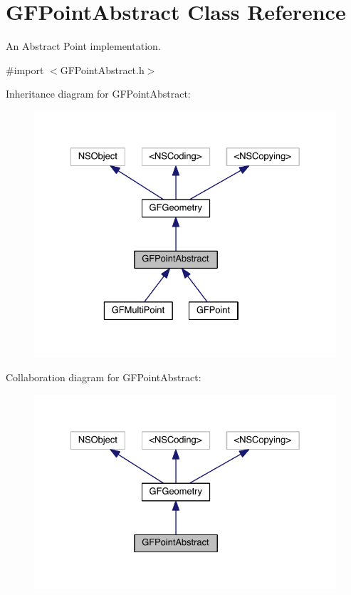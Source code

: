 \hypertarget{interface_g_f_point_abstract}{}\section{G\+F\+Point\+Abstract Class Reference}
\label{interface_g_f_point_abstract}


An Abstract Point implementation.  




{\ttfamily \#import $<$G\+F\+Point\+Abstract.\+h$>$}



Inheritance diagram for G\+F\+Point\+Abstract\+:\nopagebreak
\begin{figure}[H]
\begin{center}
\leavevmode
\includegraphics[width=329pt]{interface_g_f_point_abstract__inherit__graph}
\end{center}
\end{figure}


Collaboration diagram for G\+F\+Point\+Abstract\+:\nopagebreak
\begin{figure}[H]
\begin{center}
\leavevmode
\includegraphics[width=329pt]{interface_g_f_point_abstract__coll__graph}
\end{center}
\end{figure}
